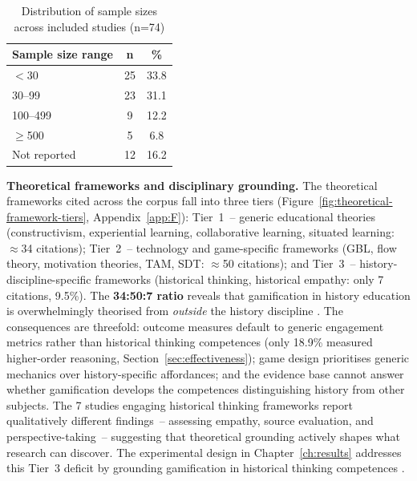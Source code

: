 \begin{table}[!h]
\centering
\caption{Distribution of sample sizes across included studies (n=74)}
\label{tab:sample-sizes}
\small
\begin{tabular}{lcc}
\hline
\textbf{Sample size range} & \textbf{n} & \textbf{\%} \\
\hline
$<$30 & 25 & 33.8 \\
30--99 & 23 & 31.1 \\
100--499 & 9 & 12.2 \\
$\geq$500 & 5 & 6.8 \\
Not reported & 12 & 16.2 \\
\hline
\end{tabular}
\end{table}

\textbf{Theoretical frameworks and disciplinary grounding.}
The theoretical frameworks cited across the corpus fall into three tiers (Figure~\ref{fig:theoretical-framework-tiers}, Appendix~\ref{app:F}): Tier~1~-- generic educational theories (constructivism, experiential learning, collaborative learning, situated learning: ${\approx}$34 citations); Tier~2~-- technology and game-specific frameworks (GBL, flow theory, motivation theories, TAM, SDT: ${\approx}$50 citations); and Tier~3~-- history-discipline-specific frameworks (historical thinking, historical empathy: only 7 citations, 9.5\%). The \textbf{34:50:7 ratio} reveals that gamification in history education is overwhelmingly theorised from \textit{outside} the history discipline \cite{Hew2019, Sailer2017, Hamari2014}. The consequences are threefold: outcome measures default to generic engagement metrics rather than historical thinking competences (only 18.9\% measured higher-order reasoning, Section~\ref{sec:effectiveness}); game design prioritises generic mechanics over history-specific affordances; and the evidence base cannot answer whether gamification develops the competences distinguishing history from other subjects. The 7 studies engaging historical thinking frameworks \cite{12Gilbert2019108, 56Akkerman2009449, 55Squire2004, 78Rouse2022357} report qualitatively different findings~-- assessing empathy, source evaluation, and perspective-taking~-- suggesting that theoretical grounding actively shapes what research can discover. The experimental design in Chapter~\ref{ch:results} addresses this Tier~3 deficit by grounding gamification in historical thinking competences \cite{Wineburg2001, MonteSano2012, Reisman2012}.

